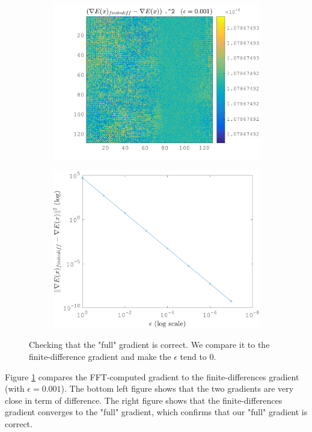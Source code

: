 \begin{figure}[!ht]
\begin{subfigure}[b]{0.40\textwidth}
\includegraphics[width=1\textwidth]{figures/verif_gradient/rest.png}
\end{subfigure}
\begin{subfigure}[b]{0.40\textwidth}\centering
\includegraphics[width=1\textwidth]{figures/verif_gradient/finite-diff-vs-grad.png}
\end{subfigure}
\caption{Checking that the "full" gradient is correct. We compare it to the finite-difference gradient and make the $\epsilon$ tend to 0.} \label{fig_verif_gradient}
\end{figure}

Figure \ref{fig_verif_gradient} compares the FFT-computed gradient to the finite-differences gradient (with $\epsilon=0.001$). The bottom left figure shows that the two gradients are very close in term of difference. The right figure shows that the finite-differences gradient converges to the "full" gradient, which confirms that our "full" gradient is correct.

